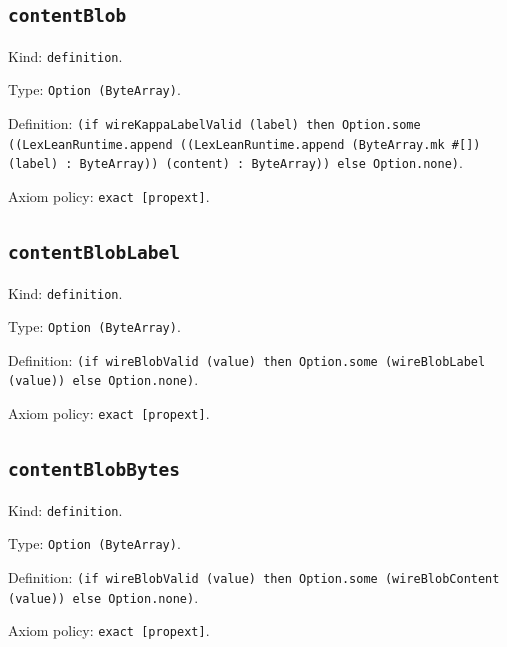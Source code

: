\documentclass[11pt]{article}
\begin{document}
\subsection*{\texttt{contentBlob}}
\noindent Kind: \texttt{definition}.\par
\noindent Type: \texttt{Option (ByteArray)}.\par
\noindent Definition: \texttt{(if wireKappaLabelValid (label) then Option.some ((LexLeanRuntime.append ((LexLeanRuntime.append (ByteArray.mk \#[]) (label) : ByteArray)) (content) : ByteArray)) else Option.none)}.\par
\noindent Axiom policy: \texttt{exact [propext]}.\par
\subsection*{\texttt{contentBlobLabel}}
\noindent Kind: \texttt{definition}.\par
\noindent Type: \texttt{Option (ByteArray)}.\par
\noindent Definition: \texttt{(if wireBlobValid (value) then Option.some (wireBlobLabel (value)) else Option.none)}.\par
\noindent Axiom policy: \texttt{exact [propext]}.\par
\subsection*{\texttt{contentBlobBytes}}
\noindent Kind: \texttt{definition}.\par
\noindent Type: \texttt{Option (ByteArray)}.\par
\noindent Definition: \texttt{(if wireBlobValid (value) then Option.some (wireBlobContent (value)) else Option.none)}.\par
\noindent Axiom policy: \texttt{exact [propext]}.\par
\end{document}
